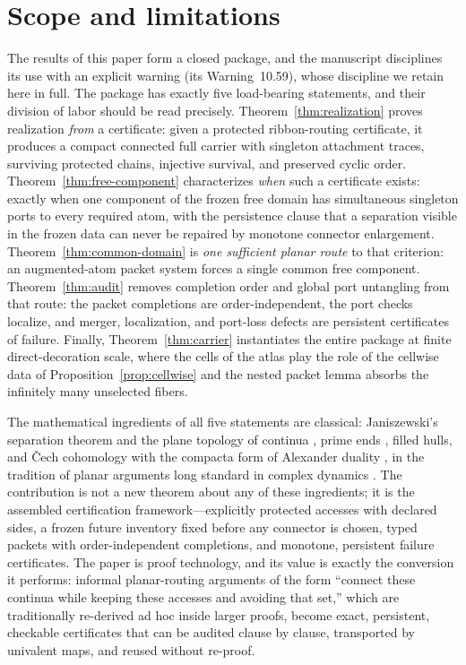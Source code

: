 
\section{Scope and limitations}\label{sec:scope}

The results of this paper form a closed package, and the manuscript
\cite{MWman} disciplines its use with an explicit warning (its
Warning~10.59), whose discipline we retain here in full.  The package has
exactly five load-bearing statements, and their division of labor should
be read precisely.  Theorem~\ref{thm:realization} proves realization
\emph{from} a certificate: given a protected ribbon-routing certificate,
it produces a compact connected full carrier with singleton attachment
traces, surviving protected chains, injective survival, and preserved
cyclic order.  Theorem~\ref{thm:free-component} characterizes \emph{when}
such a certificate exists: exactly when one component of the frozen free
domain has simultaneous singleton ports to every required atom, with the
persistence clause that a separation visible in the frozen data can never
be repaired by monotone connector enlargement.
Theorem~\ref{thm:common-domain} is \emph{one sufficient planar route} to
that criterion: an augmented-atom packet system forces a single common
free component.  Theorem~\ref{thm:audit} removes completion order and
global port untangling from that route: the packet completions are
order-independent, the port checks localize, and merger, localization,
and port-loss defects are persistent certificates of failure.  Finally,
Theorem~\ref{thm:carrier} instantiates the entire package at finite
direct-decoration scale, where the cells of the atlas play the role of
the cellwise data of Proposition~\ref{prop:cellwise} and the nested
packet lemma absorbs the infinitely many unselected fibers.

The mathematical ingredients of all five statements are classical:
Janiszewski's separation theorem and the plane topology of continua
\cite{New51,Why42}, prime ends \cite{Pom92}, filled hulls, and
\v{C}ech cohomology with the compacta form of Alexander duality
\cite{Hat02}, in the tradition of planar arguments long standard in
complex dynamics \cite{DH85}.  The contribution is not a new
theorem about any of these ingredients; it is the assembled
certification framework---explicitly protected accesses with declared
sides, a frozen future inventory fixed before any connector is chosen,
typed packets with order-independent completions, and monotone,
persistent failure certificates.  The paper is proof technology, and its
value is exactly the conversion it performs: informal planar-routing
arguments of the form ``connect these continua while keeping these
accesses and avoiding that set,'' which are traditionally re-derived ad
hoc inside larger proofs, become exact, persistent, checkable
certificates that can be audited clause by clause, transported by
univalent maps, and reused without re-proof.


